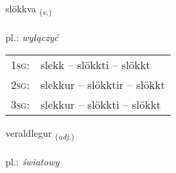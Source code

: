 \documentclass[frontgrid, backgrid]{flacards}\usepackage[]{graphicx}\usepackage[]{xcolor}
\begin{document}
\renewcommand{\flhead}{\vskip5pt \fboxsep=0pt {\small\bfseries\footnotesize Sagnorð | czasownik}}
\renewcommand{\fcfoot}{\vskip5pt \fboxsep=0pt \hspace{2pt}{\small\bfseries\footnotesize 3K}}

\renewcommand{\blhead}{\vskip5pt {\small\bfseries\footnotesize Sagnorð | czasownik }}
\renewcommand{\bcfoot}{\vskip5pt \hspace{2pt}{\small\bfseries\footnotesize 3K}}


{slökkva \small{\textsubscript{(\textit{v.})}} \\[1ex] %
\textphonetic{[stlœhkva]} \\
pl.: \emph{wyłączyć} \\  [2ex]
\renewcommand*{\arraystretch}{0.8}
\begin{tabular}{p{1cm}l}
\textsc{1sg}: & slekk -- slökkti -- slökkt \\ 
\textsc{2sg}: & slekkur -- slökktir -- slökkt \\ 
\textsc{3sg}: & slekkur -- slökkti -- slökkt \\ 
\end{tabular}
}

\renewcommand{\flhead}{\vskip5pt \fboxsep=0pt {\small\bfseries\footnotesize Lýsingarorð | przymiotnik}}
\renewcommand{\fcfoot}{\vskip5pt \fboxsep=0pt \hspace{2pt}{\small\bfseries\footnotesize 3K}}

\renewcommand{\blhead}{\vskip5pt {\small\bfseries\footnotesize Lýsingarorð | przymiotnik }}
\renewcommand{\bcfoot}{\vskip5pt \hspace{2pt}{\small\bfseries\footnotesize 3K}}


{veraldlegur \small{\textsubscript{(\textit{adj.})}} \\[1ex] %
\textphonetic{[vɛːraltlɛɣʏr]} \\
pl.: \emph{światowy} \\  [2ex]
\renewcommand*{\arraystretch}{0.8}
}
\end{document}
